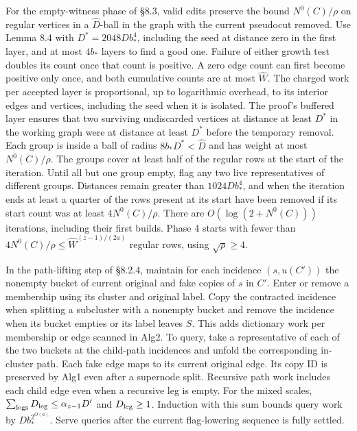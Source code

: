 \documentclass[11pt]{article}
\begin{document}
For the empty-witness phase of §8.3, valid edits preserve the bound \(N^0(C)/\rho\) on regular vertices in a \(\widehat D\)-ball in the graph with the current pseudocut removed. Use Lemma 8.4 with \(D^*=2048D b_*^4\), including the seed at distance zero in the first layer, and at most \(4b_*\) layers to find a good one. Failure of either growth test doubles its count once that count is positive. A zero edge count can first become positive only once, and both cumulative counts are at most \(\widehat W\). The charged work per accepted layer is proportional, up to logarithmic overhead, to its interior edges and vertices, including the seed when it is isolated. The proof's buffered layer ensures that two surviving undiscarded vertices at distance at least \(D^*\) in the working graph were at distance at least \(D^*\) before the temporary removal. Each group is inside a ball of radius \(8b_*D^*<\widehat D\) and has weight at most \(N^0(C)/\rho\). The groups cover at least half of the regular rows at the start of the iteration. Until all but one group empty, flag any two live representatives of different groups. Distances remain greater than \(1024D b_*^4\), and when the iteration ends at least a quarter of the rows present at its start have been removed if its start count was at least \(4N^0(C)/\rho\). There are \(O(\log(2+N^0(C)))\) iterations, including their first builds. Phase 4 starts with fewer than \(4N^0(C)/\rho\le \widehat W^{(z-1)/(2a)}\) regular rows, using \(\sqrt\rho\ge4\).

In the path-lifting step of §8.2.4, maintain for each incidence \((s,u(C'))\) the nonempty bucket of current original and fake copies of \(s\) in \(C'\). Enter or remove a membership using its cluster and original label. Copy the contracted incidence when splitting a subcluster with a nonempty bucket and remove the incidence when its bucket empties or its label leaves \(S\). This adds dictionary work per membership or edge scanned in Alg2. To query, take a representative of each of the two buckets at the child-path incidences and unfold the corresponding in-cluster path. Each fake edge maps to its current original edge. Its copy ID is preserved by Alg1 even after a supernode split. Recursive path work includes each child edge even when a recursive leg is empty. For the mixed scales, \(\sum_{\rm legs}D_{\rm leg}\le\alpha_{z-1}D'\) and \(D_{\rm leg}\ge1\). Induction with this sum bounds query work by \(D b_*^{2^{O(a)}}\). Serve queries after the current flag-lowering sequence is fully settled.
\end{document}
